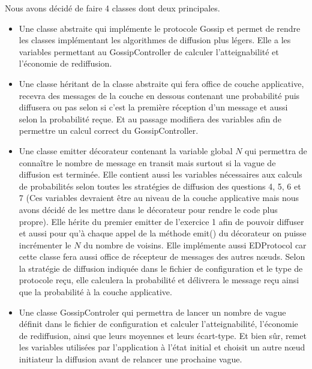 \documentclass[10pt]{report}
\begin{document}
\newpage
Nous avons décidé de faire 4 classes dont deux principales.
\begin{itemize}
\item Une classe abstraite qui implémente le protocole Gossip et permet de rendre les classes implémentant les algorithmes de diffusion plus légers. Elle a les variables permettant au GossipController de calculer l’atteignabilité et l’économie de rediffusion.\\

\item Une classe héritant de la classe abstraite qui fera office de couche applicative, recevra des messages de la couche en dessous contenant une probabilité puis diffusera ou pas selon si c'est la première réception d'un message et aussi selon la probabilité reçue. Et au passage modifiera des variables afin de permettre un calcul correct du GossipController.\\

\item Une classe emitter décorateur contenant la variable global $N$ qui permettra de connaître le nombre de message en transit mais surtout si la vague de diffusion est terminée. Elle contient aussi les variables nécessaires aux calculs de probabilités selon toutes les stratégies de diffusion des questions 4, 5, 6 et 7 (Ces variables devraient être au niveau de la couche applicative mais nous avons décidé de les mettre dans le décorateur pour rendre le code plus propre).
Elle hérite du premier emitter de l’exercice 1 afin de pouvoir diffuser et aussi pour qu’à chaque appel de la méthode emit() du décorateur on puisse incrémenter le $N$ du nombre de voisins. 
Elle implémente aussi EDProtocol car cette classe fera aussi office de récepteur de messages des autres nœuds. Selon la stratégie de diffusion indiquée dans le fichier de configuration et le type de protocole reçu, elle calculera la probabilité et délivrera le message reçu ainsi que la probabilité à la couche applicative.\\

\item Une classe GossipControler qui permettra de lancer un nombre de vague définit dans le fichier de configuration et calculer l’atteignabilité, l’économie de rediffusion, ainsi que leurs moyennes et leurs écart-type. Et bien sûr, remet les variables utilisées par l’application à l’état initial et choisit un autre nœud initiateur la diffusion avant de relancer une prochaine vague.\\
\end{itemize}
\end{document}
